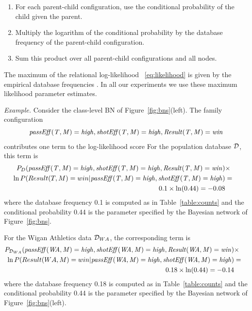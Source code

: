 {	\begin{enumerate}
		\item For each parent-child configuration, 
		use the conditional probability of the child given the parent.
		\item Multiply the logarithm of the conditional probability by the database frequency of the parent-child configuration. 
		\item Sum this product over all parent-child configurations and all nodes. 
	\end{enumerate}
	
	
	The maximum of the relational log-likelihood ~\eqref{eq:likelihood} is given by the empirical database frequencies \cite[Prop.3.1.]{Schulte2011}. In all our experiments we use these maximum likelihood parameter estimates.
	
	{\em Example.} Consider the class-level BN of Figure~\ref{fig:bns}(left). The family configuration \begin{displaymath} \it{passEff(T,M)=high}, shotEff(T,M)=high, Result(T,M)=win\end{displaymath} contributes one term to the log-likelihood score For the population database $\mathcal{D}$, this term is 
\begin{eqnarray*}
P_{D}(\it{passEff(T,M)=high}, shotEff(T,M)=high, Result(T,M)=win) &\times&\\ \ln P(Result(T,M)=win|\it{passEff(T,M)=high}, shotEff(T,M)=high)  &=&\\ 0.1 \times \ln(0.44) =-0.08 & &
\end{eqnarray*}
where the database frequency 0.1 is computed as in Table~\ref{table:counts} and the conditional probability 0.44 is the parameter specified by the Bayesian network of Figure~\ref{fig:bns}. 
	
		
	For the  Wigan Athletics data $\mathcal{D}_{WA}$, the corresponding term is 
	\begin{eqnarray*}
P_{\mathcal{D}_{WA}}(\it{passEff(WA,M)=high}, shotEff(WA,M)=high, Result(WA,M)=win) &\times&\\ \ln P(Result(WA,M)=win|\it{passEff(WA,M)=high}, shotEff(WA,M)=high)  &=&\\ 0.18 \times \ln(0.44) =-0.14 & &
\end{eqnarray*}
where the database frequency 0.18 is computed as in Table~\ref{table:counts} and the conditional probability 0.44 is the parameter specified by the Bayesian network of Figure~\ref{fig:bns}(left). 


}
